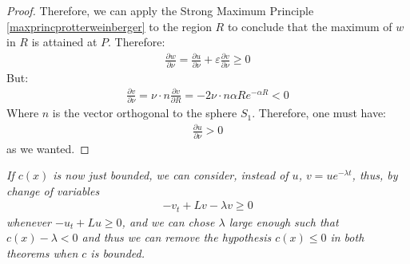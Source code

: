 \begin{proof}
	Therefore, we can apply the Strong Maximum Principle \ref{maxprincprotterweinberger} to the region $R$ to conclude that the maximum of $w$ in $R$ is attained at $P$. Therefore:
	\begin{align*}
		\frac{\partial w}{\partial \nu}=\frac{\partial u}{\partial \nu}+\varepsilon\frac{\partial v}{\partial \nu}\geq0
	\end{align*}
	But:
	\begin{align*}
		\frac{\partial v}{\partial \nu}=\nu \cdot n\frac{\partial v}{\partial R} = - 2\nu \cdot n \alpha Re^{-\alpha R}<0
	\end{align*}
	Where $n$ is the vector orthogonal to the sphere $S_1$. Therefore, one must have:  
	\begin{align*}
		\frac{\partial u}{\partial \nu}>0
	\end{align*}
	as we wanted.
\end{proof}
\begin{oss}\label{removecpositive}
	\em If $c(x)$ is now just bounded, we can consider, instead of $u$, $v= u e^{-\lambda t}$, thus, by change of variables 
	\begin{align*}
		-v_t+Lv-\lambda v \geq 0
	\end{align*}
	whenever $-u_t+Lu\geq 0$, and we can chose $\lambda$ large enough such that $c(x)-\lambda<0$ and thus we can remove the hypothesis $c(x)\leq0$ in both theorems when $c$ is bounded. 
\end{oss}

